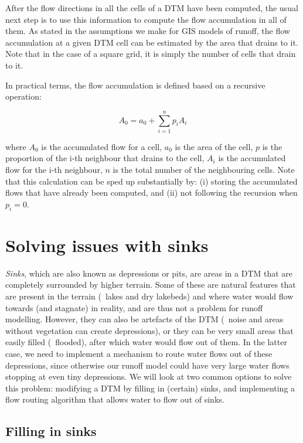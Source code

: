 After the flow directions in all the cells of a DTM have been computed, the usual next step is to use this information to compute the flow accumulation in all of them.
As stated in the assumptions we make for GIS models of runoff, the flow accumulation at a given DTM cell can be estimated by the area that drains to it.
Note that in the case of a square grid, it is simply the number of cells that drain to it.

In practical terms, the flow accumulation is defined based on a recursive operation:

\begin{equation}
A_0 = a_0 + \sum_{i=1}^{n} p_i A_i
\end{equation}

where \(A_0\) is the accumulated flow for a cell, \(a_0\) is the area of the cell, \(p\) is the proportion of the i-th neighbour that drains to the cell, \(A_i\) is the accumulated flow for the i-th neighbour, \(n\) is the total number of the neighbouring cells.
Note that this calculation can be sped up substantially by: (i) storing the accumulated flows that have already been computed, and (ii) not following the recursion when \(p_i = 0\).


\section{Solving issues with sinks}

\emph{Sinks}, which are also known as depressions or pits, are areas in a DTM that are completely surrounded by higher terrain.
Some of these are natural features that are present in the terrain (\eg\ lakes and dry lakebeds) and where water would flow towards (and stagnate) in reality, and are thus not a problem for runoff modelling.
However, they can also be artefacts of the DTM (\eg\ noise and areas without vegetation can create depressions), or they can be very small areas that easily filled (\ie\ flooded), after which water would flow out of them.
In the latter case, we need to implement a mechanism to route water flows out of these depressions, since otherwise our runoff model could have very large water flows stopping at even tiny depressions.
We will look at two common options to solve this problem: modifying a DTM by filling in (certain) sinks, and implementing a flow routing algorithm that allows water to flow out of sinks.

\subsection{Filling in sinks}%

